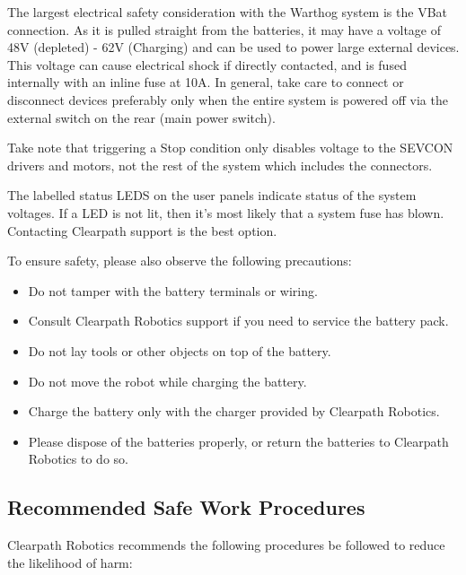 \documentclass[]{clearpath-latex/clearpath-manual}
\begin{document}
The largest electrical safety consideration with the Warthog system is the VBat connection. As it is pulled straight from the batteries, it may have a voltage of 48V (depleted) - 62V (Charging) and can be used to power large external devices. This voltage can cause electrical shock if directly contacted, and is fused internally with an inline fuse at 10A. In general, take care to connect or disconnect devices preferably only when the entire system is powered off via the external switch on the rear (main power switch).

Take note that triggering a Stop condition only disables voltage to the SEVCON drivers and motors, not the rest of the system which includes the connectors.

The labelled status LEDS on the user panels indicate status of the system voltages. If a LED is not lit, then it's most likely that a system fuse has blown. Contacting Clearpath support is the best option.

To ensure safety, please also observe the following precautions:

\begin{itemize}[nolistsep]
  \item Do not tamper with the battery terminals or wiring.
  \item Consult Clearpath Robotics support if you need to service the battery pack.
  \item Do not lay tools or other objects on top of the battery.
  \item Do not move the robot while charging the battery.
  \item Charge the battery only with the charger provided by Clearpath Robotics.
  \item Please dispose of the batteries properly, or return the batteries to Clearpath Robotics to do so.
\end{itemize}

\subsection{Recommended Safe Work Procedures}

Clearpath Robotics recommends the following procedures be followed to reduce the likelihood of harm:
\end{document}
